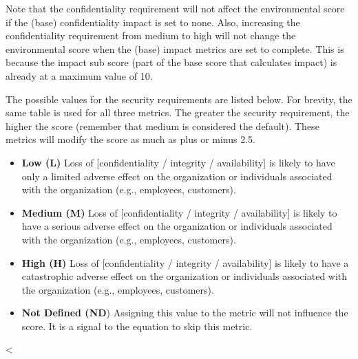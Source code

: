   Note that the confidentiality requirement will not affect the
  environmental score if the (base) confidentiality impact is set to none.
  Also, increasing the confidentiality requirement from medium to high
  will not change the environmental score when the (base) impact metrics
  are set to complete. This is because the impact sub score (part of the
  base score that calculates impact) is already at a maximum value of 10.

  The possible values for the security requirements are listed below. For
  brevity, the same table is used for all three metrics. The greater the
  security requirement, the higher the score (remember that medium is considered
  the default). These metrics will modify the score as much as plus or minus
  2.5.

  \begin{itemize}
  \item
    \textbf{Low (L)} Loss of {[}confidentiality / integrity /
    availability{]} is likely to have only a limited adverse effect on the
    organization or individuals associated with the organization (e.g.,
    employees, customers).
  \item
    \textbf{Medium (M)} Loss of {[}confidentiality / integrity /
    availability{]} is likely to have a serious adverse effect on the
    organization or individuals associated with the organization (e.g.,
    employees, customers).
  \item
    \textbf{High (H)} Loss of {[}confidentiality / integrity /
    availability{]} is likely to have a catastrophic adverse effect on the
    organization or individuals associated with the organization (e.g.,
    employees, customers).
  \item
    \textbf{Not Defined (ND}) Assigning this value to the metric will not
    influence the score. It is a signal to the equation to skip this
    metric.
  \end{itemize}


<%
